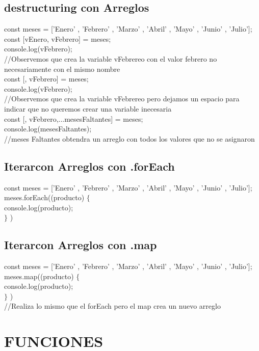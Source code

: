 \documentclass[10pt,a4paper]{article}
\begin{document}
\newpage
\subsection{destructuring con Arreglos} 
const meses = ['Enero' , 'Febrero' , 'Marzo' , 'Abril' , 'Mayo' , 'Junio' , 'Julio']; \\
const [vEnero, vFebrero] = meses;\\
console.log(vFebrero); \\
//Observemos que crea la variable vFebrereo con el valor febrero no necesariamente con el mismo nombre \\
const [, vFebrero] = meses;\\
console.log(vFebrero); \\
//Observemos que crea la variable vFebrereo pero dejamos un espacio para indicar que no queremos crear una variable inecesaria\\
const [, vFebrero,...mesesFaltantes] = meses;\\
console.log(mesesFaltantes); \\
//meses Faltantes obtendra un arreglo con todos los valores que no se asignaron\\

\subsection{Iterarcon Arreglos con .forEach} 
const meses = ['Enero' , 'Febrero' , 'Marzo' , 'Abril' , 'Mayo' , 'Junio' , 'Julio']; \\
meses.forEach((producto) $ \{ $ \\ 
console.log(producto); \\ 
$\} $ )\\
\subsection{Iterarcon Arreglos con .map} 
const meses = ['Enero' , 'Febrero' , 'Marzo' , 'Abril' , 'Mayo' , 'Junio' , 'Julio']; \\
meses.map((producto) $ \{ $ \\ 
console.log(producto); \\ 
$\} $ )\\
//Realiza lo mismo que el forEach pero el map crea un nuevo arreglo\\

\newpage
\section{FUNCIONES}
\end{document}
